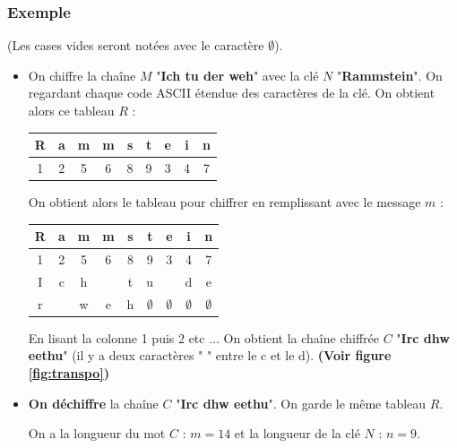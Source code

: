 \documentclass{article}
\begin{document}
\subsubsection{Exemple}
(Les cases vides seront notées avec le caractère $\emptyset$).
\begin{itemize}
\item On chiffre la chaîne $M$ "\textbf{Ich tu der weh}" avec la clé $N$ "\textbf{Rammstein}". On regardant chaque code ASCII étendue des caractères de la clé. On obtient alors ce tableau $R$ : 
\vspace{1\baselineskip}

\begin{center}
\begin{tabular}{|c|c|c|c|c|c|c|c|c|}
\hline
R & a & m & m & s & t & e & i & n\\
\hline
1 & 2 & 5 & 6 & 8 & 9 & 3 & 4 & 7\\
\hline
\end{tabular}
\end{center}
\vspace{1\baselineskip}

On obtient alors le tableau pour chiffrer en remplissant avec le message $m$ : 
\vspace{1\baselineskip}

\begin{center}
\begin{tabular}{|c|c|c|c|c|c|c|c|c|}
\hline
R & a & m & m & s & t & e & i & n\\
\hline
1 & 2 & 5 & 6 & 8 & 9 & 3 & 4 & 7\\
\hline
I & c & h &  & t & u &  & d & e\\
\hline
r &  & w & e & h & $\emptyset$ & $\emptyset$ & $\emptyset$ & $\emptyset$\\
\hline
\end{tabular}
\end{center}
\vspace{1\baselineskip}

En lisant la colonne 1 puis 2 etc ... On obtient la chaîne chiffrée $C$ "\textbf{Irc  dhw eethu}" (il y a deux caractères " " entre le c et le d). \textbf{(Voir figure \ref{fig:transpo})}
\vspace{1\baselineskip}


\item \textbf{On déchiffre} la chaîne $C$ "\textbf{Irc  dhw eethu}". On garde le même tableau $R$.

On a la longueur du mot $C$ : $m=14$ et la longueur de la clé $N$ : $n = 9$. 


\end{itemize}
\end{document}
